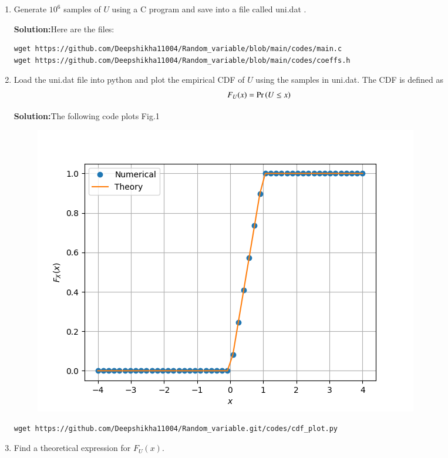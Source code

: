 \documentclass[journal,12pt,twocolumn]{IEEEtran}
\renewcommand\thesection{\arabic{section}}
\begin{document}
\begin{enumerate}[label=\thesection.\arabic*
,ref=\thesection.\theenumi]
\item Generate $10^6$ samples of $U$ using a C program and save into a file called uni.dat .

\textbf{Solution:}Here are the files:
\begin{lstlisting}
wget https://github.com/Deepshikha11004/Random_variable/blob/main/codes/main.c
wget https://github.com/Deepshikha11004/Random_variable/blob/main/codes/coeffs.h

\end{lstlisting}

%
\item
Load the uni.dat file into python and plot the empirical CDF of $U$ using the samples in uni.dat. The CDF is defined as
\begin{align}
F_{U}(x) = \Pr\left(U \le x\right)
\end{align}
 
\textbf{Solution:}The following code plots Fig.1

\begin{figure}[!ht]
    \centering
    \includegraphics[width=\columnwidth]
    {uni_cdf.png}
    \caption{}
    \label{fig1}
\end{figure}

\begin{lstlisting}
wget https://github.com/Deepshikha11004/Random_variable.git/codes/cdf_plot.py
\end{lstlisting}


\item
Find a  theoretical expression for $F_{U}(x)$.



\end{enumerate}
\end{document}
